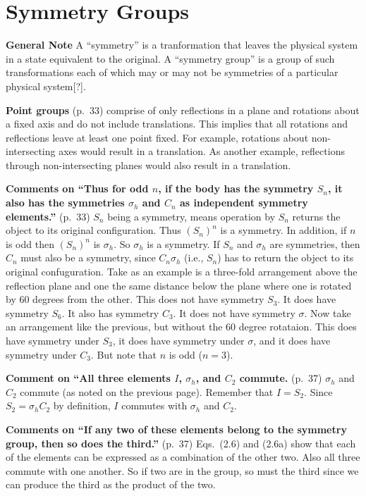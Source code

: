 \chapter{Symmetry Groups}

{\bf General Note} A ``symmetry'' is a tranformation that leaves the
physical system in a state equivalent to the original. A ``symmetry
group'' is a group of such transformations each of which may or may
not be symmetries of a particular physical system[?].

{\bf Point groups} (p.\ 33) comprise of only reflections in a plane and
rotations about a fixed axis and do not include translations. This
implies that all rotations and reflections leave at least one point
fixed. For example, rotations about non-intersecting axes would result
in a translation. As another example, reflections through
non-intersecting planes would also result in a translation.

{\bf Comments on ``Thus for odd $n$, if the body has the symmetry
  $S_n$, it also has the symmetries $\sigma_h$ and $C_n$ as
  independent symmetry elements.''} (p.\ 33) $S_n$ being a symmetry,
means operation by $S_n$ returns the object to its original
configuration. Thus $(S_n)^n$ is a symmetry. In addition, if $n$ is
odd then $(S_n)^n$ is $\sigma_h$. So $\sigma_h$ is a symmetry. If
$S_n$ and $\sigma_h$ are symmetries, then $C_n$ must also be a
symmetry, since $C_n \sigma_h$ (i.e., $S_n$) has to return the object
to its original confuguration. Take as an example is a three-fold
arrangement above the reflection plane and one the same distance below
the plane where one is rotated by 60 degrees from the other.  This
does not have symmetry $S_3$. It does have symmetry $S_6$. It also has
symmetry $C_3$. It does not have symmetry $\sigma$.  Now take an
arrangement like the previous, but without the 60 degree
rotataion. This does have symmetry under $S_3$, it does have symmetry
under $\sigma$, and it does have symmetry under $C_3$. But note that
$n$ is odd ($n = 3$).

{\bf Comment on ``All three elements $I$, $\sigma_h$, and $C_2$
  commute.} (p.\ 37) $\sigma_h$ and $C_2$ commute (as noted on the
previous page). Remember that $I = S_2$. Since $S_2 = \sigma_h C_2$ by
definition, $I$ commutes with $\sigma_h$ and $C_2$.

{\bf Comments on ``If any two of these elements belong to the symmetry
  group, then so does the third.''} (p.\ 37) Eqs.\ (2.6) and (2.6a)
show that each of the elements can be expressed as a combination of
the other two. Also all three commute with one another. So if two are
in the group, so must the third since we can produce the third as the
product of the two.

